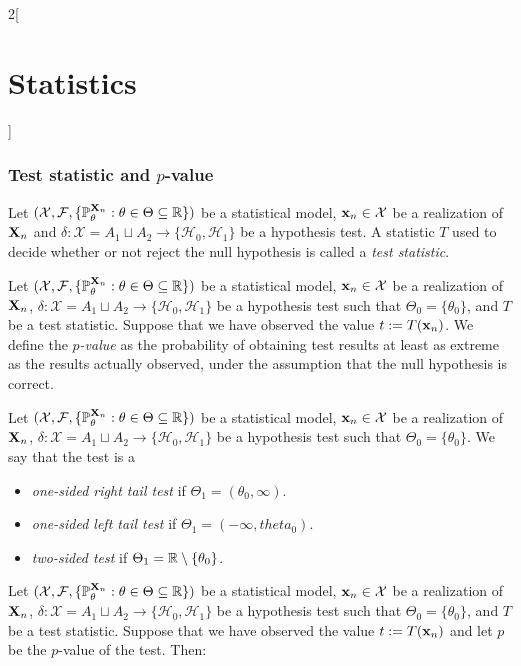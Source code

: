 \documentclass[../../../main.tex]{subfiles}
\begin{document}
\begin{multicols}{2}[\section{Statistics}]
  \subsubsection{Test statistic and \texorpdfstring{$p$}{p}-value}
  \begin{definition}
    Let $(\mathcal{X},\mathcal{F},\{\mathbb{P}_\theta^{\boldsymbol{\mathrm{X}}_n}:\theta\in\Theta\subseteq\mathbb{R}\})$ be a statistical model, $\boldsymbol{\mathrm{x}}_n\in\mathcal{X}$ be a realization of $\boldsymbol{\mathrm{X}}_n$ and $\delta:\mathcal{X}=A_1\sqcup A_2\rightarrow\{\mathcal{H}_0,\mathcal{H}_1\}$ be a hypothesis test. A statistic $T$ used to decide whether or not reject the null hypothesis is called a \emph{test statistic}.
  \end{definition}
  \begin{definition}
    Let $(\mathcal{X},\mathcal{F},\{\mathbb{P}_\theta^{\boldsymbol{\mathrm{X}}_n}:\theta\in\Theta\subseteq\mathbb{R}\})$ be a statistical model, $\boldsymbol{\mathrm{x}}_n\in\mathcal{X}$ be a realization of $\boldsymbol{\mathrm{X}}_n$, $\delta:\mathcal{X}=A_1\sqcup A_2\rightarrow\{\mathcal{H}_0,\mathcal{H}_1\}$ be a hypothesis test such that $\Theta_0=\{\theta_0\}$, and $T$ be a test statistic. Suppose that we have observed the value $t:=T(\boldsymbol{\mathrm{x}}_n)$. We define the \emph{$p$-value} as the probability of obtaining test results at least as extreme as the results actually observed, under the assumption that the null hypothesis is correct.
  \end{definition}
  \begin{definition}
    Let $(\mathcal{X},\mathcal{F},\{\mathbb{P}_\theta^{\boldsymbol{\mathrm{X}}_n}:\theta\in\Theta\subseteq\mathbb{R}\})$ be a statistical model, $\boldsymbol{\mathrm{x}}_n\in\mathcal{X}$ be a realization of $\boldsymbol{\mathrm{X}}_n$, $\delta:\mathcal{X}=A_1\sqcup A_2\rightarrow\{\mathcal{H}_0,\mathcal{H}_1\}$ be a hypothesis test such that $\Theta_0=\{\theta_0\}$. We say that the test is a
    \begin{itemize}
      \item \emph{one-sided right tail test} if $\Theta_1=(\theta_0,\infty)$.
      \item \emph{one-sided left tail test} if $\Theta_1=(-\infty,theta_0)$.
      \item \emph{two-sided test} if $\Theta_1=\mathbb{R}\setminus\{\theta_0\}$.
    \end{itemize}
  \end{definition}
  \begin{proposition}
    Let $(\mathcal{X},\mathcal{F},\{\mathbb{P}_\theta^{\boldsymbol{\mathrm{X}}_n}:\theta\in\Theta\subseteq\mathbb{R}\})$ be a statistical model, $\boldsymbol{\mathrm{x}}_n\in\mathcal{X}$ be a realization of $\boldsymbol{\mathrm{X}}_n$, $\delta:\mathcal{X}=A_1\sqcup A_2\rightarrow\{\mathcal{H}_0,\mathcal{H}_1\}$ be a hypothesis test such that $\Theta_0=\{\theta_0\}$, and $T$ be a test statistic. Suppose that we have observed the value $t:=T(\boldsymbol{\mathrm{x}}_n)$ and let $p$ be the $p$-value of the test. Then:

\end{proposition}
\end{multicols}
\end{document}
